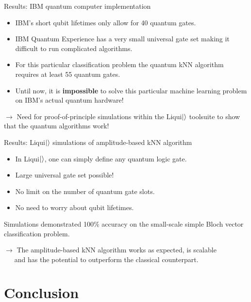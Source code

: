 \documentclass[10pt]{beamer}
\begin{document}
{
\begin{frame}{Results: IBM quantum computer implementation}

\begin{itemize}
\item IBM's short qubit lifetimes only allow for 40 quantum gates. 
\item IBM Quantum Experience has a very small universal gate set making it difficult to run complicated algorithms.
\item For this particular classification problem the quantum kNN algorithm requires at least 55 quantum gates.
\item Until now, it is \textbf{impossible} to solve this particular machine learning problem on IBM's actual quantum hardware!
\end{itemize}

$\rightarrow$ Need for proof-of-principle simulations within the Liqui$\ket{}$ toolsuite to show that the quantum algorithms work!

\end{frame}
}

{
\begin{frame}{Results: Liqui$\ket{}$ simulations of amplitude-based kNN algorithm}

\begin{itemize}
\item In Liqui$\ket{}$, one can simply define any quantum logic gate.
\item Large universal gate set possible!
\item No limit on the number of quantum gate slots.
\item No need to worry about qubit lifetimes.
\end{itemize}

Simulations demonstrated 100\% accuracy on the small-scale simple Bloch vector classification problem.

$\rightarrow$ The amplitude-based kNN algorithm works as expected, is scalable\\$\quad\>$ and has the potential to outperform the classical counterpart.

\end{frame}
}

\section{Conclusion}
\end{document}
